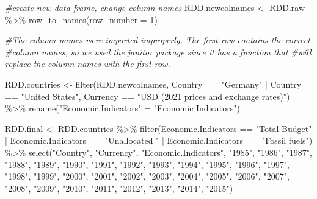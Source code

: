 \documentclass[
  12pt,
]{article}
\newenvironment{Shaded}{\begin{snugshade}}{\end{snugshade}}
\newcommand{\AttributeTok}[1]{\textcolor[rgb]{0.77,0.63,0.00}{#1}}
\newcommand{\CommentTok}[1]{\textcolor[rgb]{0.56,0.35,0.01}{\textit{#1}}}
\newcommand{\DecValTok}[1]{\textcolor[rgb]{0.00,0.00,0.81}{#1}}
\newcommand{\FunctionTok}[1]{\textcolor[rgb]{0.00,0.00,0.00}{#1}}
\newcommand{\NormalTok}[1]{#1}
\newcommand{\OtherTok}[1]{\textcolor[rgb]{0.56,0.35,0.01}{#1}}
\newcommand{\SpecialCharTok}[1]{\textcolor[rgb]{0.00,0.00,0.00}{#1}}
\newcommand{\StringTok}[1]{\textcolor[rgb]{0.31,0.60,0.02}{#1}}
\begin{document}
\begin{Shaded}
\begin{Highlighting}[]
\CommentTok{\#create new data frame, change column names}
\NormalTok{RDD.newcolnames }\OtherTok{\textless{}{-}}\NormalTok{ RDD.raw }\SpecialCharTok{\%\textgreater{}\%}
  \FunctionTok{row\_to\_names}\NormalTok{(}\AttributeTok{row\_number =} \DecValTok{1}\NormalTok{)}

\CommentTok{\#The column names were imported improperly. The first row contains the correct }
\CommentTok{\#column names, so we used the janitor package since it has a function that }
\CommentTok{\#will replace the column names with the first row.}

\NormalTok{RDD.countries }\OtherTok{\textless{}{-}}
  \FunctionTok{filter}\NormalTok{(RDD.newcolnames,}
\NormalTok{         Country }\SpecialCharTok{==} \StringTok{"Germany"} \SpecialCharTok{|}\NormalTok{ Country }\SpecialCharTok{==} \StringTok{"United States"}\NormalTok{,}
\NormalTok{         Currency }\SpecialCharTok{==} \StringTok{"USD (2021 prices and exchange rates)"}\NormalTok{) }\SpecialCharTok{\%\textgreater{}\%}
  \FunctionTok{rename}\NormalTok{(}\StringTok{"Economic.Indicators"} \OtherTok{=} \StringTok{"Economic Indicators"}\NormalTok{)}

\NormalTok{RDD.final }\OtherTok{\textless{}{-}}\NormalTok{ RDD.countries }\SpecialCharTok{\%\textgreater{}\%}
  \FunctionTok{filter}\NormalTok{(Economic.Indicators }\SpecialCharTok{==} \StringTok{"Total Budget"} \SpecialCharTok{|}\NormalTok{ Economic.Indicators }\SpecialCharTok{==} \StringTok{"Unallocated "} \SpecialCharTok{|}\NormalTok{ Economic.Indicators }\SpecialCharTok{==} \StringTok{"Fossil fuels"}\NormalTok{) }\SpecialCharTok{\%\textgreater{}\%}
  \FunctionTok{select}\NormalTok{(}\StringTok{"Country"}\NormalTok{, }\StringTok{"Currency"}\NormalTok{, }\StringTok{"Economic.Indicators"}\NormalTok{, }\StringTok{"1985"}\NormalTok{, }\StringTok{"1986"}\NormalTok{, }\StringTok{"1987"}\NormalTok{, }\StringTok{"1988"}\NormalTok{, }\StringTok{"1989"}\NormalTok{, }\StringTok{"1990"}\NormalTok{, }\StringTok{"1991"}\NormalTok{, }\StringTok{"1992"}\NormalTok{, }\StringTok{"1993"}\NormalTok{, }\StringTok{"1994"}\NormalTok{, }\StringTok{"1995"}\NormalTok{, }\StringTok{"1996"}\NormalTok{, }\StringTok{"1997"}\NormalTok{, }\StringTok{"1998"}\NormalTok{, }\StringTok{"1999"}\NormalTok{, }\StringTok{"2000"}\NormalTok{, }\StringTok{"2001"}\NormalTok{, }\StringTok{"2002"}\NormalTok{, }\StringTok{"2003"}\NormalTok{, }\StringTok{"2004"}\NormalTok{, }\StringTok{"2005"}\NormalTok{, }\StringTok{"2006"}\NormalTok{, }\StringTok{"2007"}\NormalTok{, }\StringTok{"2008"}\NormalTok{, }\StringTok{"2009"}\NormalTok{, }\StringTok{"2010"}\NormalTok{, }\StringTok{"2011"}\NormalTok{, }\StringTok{"2012"}\NormalTok{, }\StringTok{"2013"}\NormalTok{, }\StringTok{"2014"}\NormalTok{, }\StringTok{"2015"}\NormalTok{)}


\end{Highlighting}
\end{Shaded}
\end{document}
